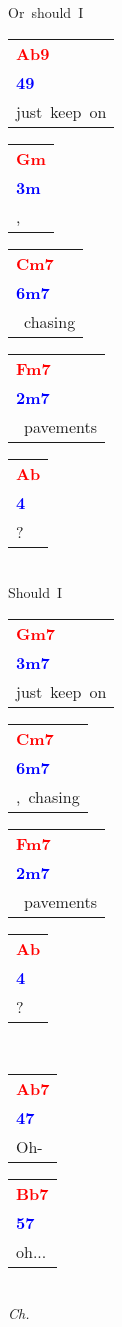 \documentclass[12pt,a4paper,openany,UTF8]{memoir}
\begin{document}
Or~should~I~\begin{tabular}[b]{l}
    \textbf{\textcolor{red}{Ab9}}\\\textbf{\textcolor{blue}{49}}\\
    just~keep~on\mbox{}\end{tabular}\begin{tabular}[b]{l}
    \textbf{\textcolor{red}{Gm}}\\\textbf{\textcolor{blue}{3m}}\\
    ,\mbox{}\end{tabular}\begin{tabular}[b]{l}
    \textbf{\textcolor{red}{Cm7}}\\\textbf{\textcolor{blue}{6m7}}\\
    ~chasing\mbox{}\end{tabular}\begin{tabular}[b]{l}
    \textbf{\textcolor{red}{Fm7}}\\\textbf{\textcolor{blue}{2m7}}\\
    ~pavements\mbox{}\end{tabular}\begin{tabular}[b]{l}
    \textbf{\textcolor{red}{Ab}}\\\textbf{\textcolor{blue}{4}}\\
    ?\mbox{}\end{tabular}\\
Should~I~\begin{tabular}[b]{l}
    \textbf{\textcolor{red}{Gm7}}\\\textbf{\textcolor{blue}{3m7}}\\
    just~keep~on\mbox{}\end{tabular}\begin{tabular}[b]{l}
    \textbf{\textcolor{red}{Cm7}}\\\textbf{\textcolor{blue}{6m7}}\\
    ,~chasing\mbox{}\end{tabular}\begin{tabular}[b]{l}
    \textbf{\textcolor{red}{Fm7}}\\\textbf{\textcolor{blue}{2m7}}\\
    ~pavements\mbox{}\end{tabular}\begin{tabular}[b]{l}
    \textbf{\textcolor{red}{Ab}}\\\textbf{\textcolor{blue}{4}}\\
    ?\mbox{}\end{tabular}\\
\begin{tabular}[b]{l}
    \textbf{\textcolor{red}{Ab7}}\\\textbf{\textcolor{blue}{47}}\\
    Oh-\mbox{}\end{tabular}\begin{tabular}[b]{l}
    \textbf{\textcolor{red}{Bb7}}\\\textbf{\textcolor{blue}{57}}\\
    oh...\mbox{}\end{tabular}\\
\emph{Ch.}
\end{document}

